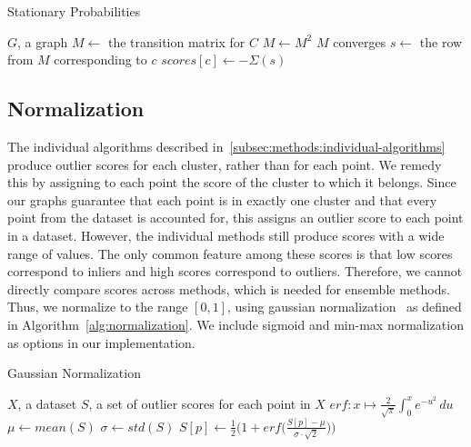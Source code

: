 \begin{algorithm}[h]
    \caption{Stationary Probabilities}
    \label{alg:sp}
\begin{algorithmic}[1]
    \REQUIRE $G$, a graph
        \STATE $M \gets$ the transition matrix for $C$
        \REPEAT
            \STATE $M \gets M^2$
        \UNTIL $M$ converges
            \STATE $s \gets $ the row from $M$ corresponding to $c$
            \STATE $scores[c] \gets -\Sigma(s)$ 
        \ENDFOR
    \ENDFOR
\end{algorithmic}
\end{algorithm}


\subsection{Normalization}
\label{subsec:methods:normalization}

The individual algorithms described in~\ref{subsec:methods:individual-algorithms} produce outlier scores for each cluster, rather than for each point.
We remedy this by assigning to each point the score of the cluster to which it belongs.
Since our graphs guarantee that each point is in exactly one cluster and that every point from the dataset is accounted for, this assigns an outlier score to each point in a dataset.
However, the individual methods still produce scores with a wide range of values.
The only common feature among these scores is that low scores correspond to inliers and high scores correspond to outliers.
Therefore, we cannot directly compare scores across methods, which is needed for ensemble methods.
Thus, we normalize to the range $[0, 1]$, using gaussian normalization~\cite{kriegel2011interpreting} as defined in Algorithm~\ref{alg:normalization}.
We include sigmoid and min-max normalization as options in our implementation.

\begin{algorithm}[h]
    \caption{Gaussian Normalization}
    \label{alg:normalization}
\begin{algorithmic}[1]
    \REQUIRE $X$, a dataset
    \REQUIRE $S$, a set of outlier scores for each point in $X$
    \STATE $erf: x \mapsto \frac{2}{\sqrt{\pi}} \int_{0}^{x} e^{-u^2} \,du $
    \STATE $\mu \gets mean(S)$
    \STATE $\sigma \gets std(S)$
        \STATE $S[p] \gets \frac{1}{2} \Big( 1 + erf \big(\frac{S[p] - \mu}{\sigma \cdot \sqrt{2}}\big) \Big) $
    \ENDFOR
\end{algorithmic}
\end{algorithm}

